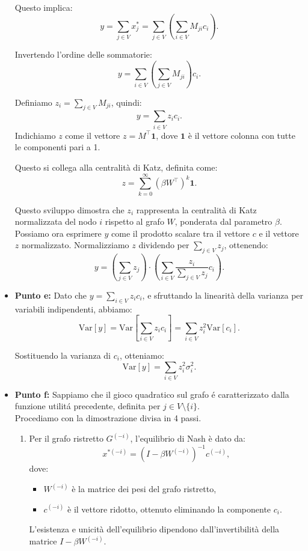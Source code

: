 \documentclass[a4paper,12pt]{article}
\begin{document}
\begin{itemize}
		Questo implica:
		$$
		y = \sum_{j \in V} x_j^* = \sum_{j \in V} \left( \sum_{i \in V} M_{ji} c_i \right).
		$$
		
		Invertendo l'ordine delle sommatorie:
		$$
		y = \sum_{i \in V} \left( \sum_{j \in V} M_{ji} \right) c_i.
		$$
		
		Definiamo \( z_i = \sum_{j \in V} M_{ji} \), quindi:
		$$
		y = \sum_{i \in V} z_i c_i.
		$$
		Indichiamo $z$ come il vettore \( z = M^\top \mathbf{1} \), dove \( \mathbf{1} \) è il vettore colonna con tutte le componenti pari a 1.
		
		Questo si collega alla centralità di Katz, definita come:
		$$
		z = \sum_{k=0}^\infty (\beta W^\top)^k \mathbf{1}.
		$$
		
		Questo sviluppo dimostra che \( z_i \) rappresenta la centralità di Katz normalizzata del nodo \( i \) rispetto al grafo \( W \), ponderata dal parametro \( \beta \).
		Possiamo ora esprimere \( y \) come il prodotto scalare tra il vettore \( c \) e il vettore \( z \) normalizzato. Normalizziamo \( z \) dividendo per \( \sum_{j \in V} z_j \), ottenendo:
		$$
		y = \left( \sum_{j \in V} z_j \right) \cdot \left( \sum_{i \in V} \frac{z_i}{\sum_{j \in V} z_j} c_i \right).
		$$
		
		\item \textbf{Punto e: }
		Dato che \( y = \sum_{i \in V} z_i c_i \), e sfruttando la linearità della varianza per variabili indipendenti, abbiamo:
		$$
		\mathrm{Var}[y] = \mathrm{Var} \left[ \sum_{i \in V} z_i c_i \right] = \sum_{i \in V} z_i^2 \mathrm{Var}[c_i].
		$$
		
		Sostituendo la varianza di \( c_i \), otteniamo:
		$$
		\mathrm{Var}[y] = \sum_{i \in V} z_i^2 \sigma_i^2.
		$$
		
		\item \textbf{Punto f: }
		Sappiamo che il gioco quadratico sul grafo é caratterizzato dalla funzione utilitá precedente, definita per $j \in V \setminus \{i\}
		$.\\
		Procediamo con la dimostrazione divisa in 4 passi.
		\begin{enumerate}
			\item {} Per il grafo ristretto $G^{(-i)}$, l'equilibrio di Nash è dato da:
			$$
			x^{*(-i)} = \left(I - \beta W^{(-i)}\right)^{-1} c^{(-i)},
			$$
			dove:
			\begin{itemize}
				\item $W^{(-i)}$ è la matrice dei pesi del grafo ristretto,
				\item $c^{(-i)}$ è il vettore  ridotto, ottenuto eliminando la componente $c_i$.
			\end{itemize}
			L'esistenza e unicità dell'equilibrio dipendono dall'invertibilità della matrice $I - \beta W^{(-i)}$.
			

\end{enumerate}
\end{itemize}
\end{document}
